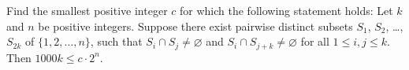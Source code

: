 Find the smallest positive integer $c$ for which the following statement holds: Let $k$ and $n$ be positive integers. Suppose there exist pairwise distinct subsets $S_1$, $S_2$, \dots, $S_{2k}$ of $\{1, 2, \dots, n\}$, such that $S_i \cap S_j \neq \varnothing$ and $S_i \cap S_{j+k} \neq \varnothing$ for all $1 \le i,j \le k$. Then $1000k \le c \cdot 2^n$.
